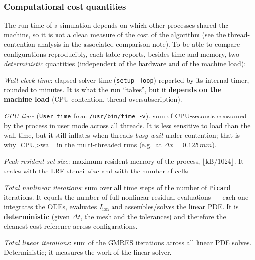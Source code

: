 \documentclass[11pt,a4paper]{article}
\newcommand{\code}[1]{\texttt{\small #1}}
\newcommand{\Iion}{I_{\mathrm{ion}}}
\begin{document}
\subsubsection{Computational cost quantities}
\label{sec:res2d:cost}

The run time of a simulation depends on which other processes shared the
machine, so it is not a clean measure of the cost of the algorithm (see the
thread-contention analysis in the associated comparison note). To be able to compare
configurations reproducibly, each table reports, besides time and
memory, two \emph{deterministic} quantities (independent of the hardware and of the
machine load):

\begin{description}[topsep=2pt,itemsep=2pt,leftmargin=1.4em]
  \item[wall {[min]}] \emph{Wall-clock time}: elapsed solver time
        (\code{setup}+\code{loop}) reported by its internal timer, rounded to
        minutes. It is what the run ``takes'', but it \textbf{depends on the machine
        load} (CPU contention, thread oversubscription).
  \item[CPU {[min]}] \emph{CPU time} (\code{User time} from
        \texttt{/usr/bin/time -v}): sum of CPU-seconds consumed by the process in
        user mode across all threads. It is less sensitive to load than the
        wall time, but it still inflates when threads \emph{busy-wait} under
        contention; that is why $\text{CPU}>\text{wall}$ in the multi-threaded runs (e.g.\
        at $\Delta x=\SI{0.125}{mm}$).
  \item[RSS {[MiB]}] \emph{Peak resident set size}: maximum resident memory of the
        process, $\lfloor\text{kB}/1024\rfloor$. It scales with the LRE stencil size
        and with the number of cells.
  \item[$N_{\mathrm{nl}}$] \emph{Total nonlinear iterations}: sum over all
        time steps of the number of \code{Picard} iterations. It equals the
        number of full nonlinear residual evaluations --- each one integrates
        the ODEs, evaluates $\Iion$ and assembles/solves the linear PDE. It is
        \textbf{deterministic} (given $\Delta t$, the mesh and the tolerances) and
        therefore the cleanest cost reference across configurations.
  \item[$N_{\mathrm{lin}}$] \emph{Total linear iterations}: sum of the
        GMRES iterations across all linear PDE solves.
        Deterministic; it measures the work of the linear solver.
\end{description}
\end{document}
